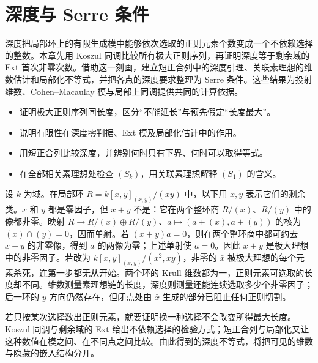 
\chapter{深度与 Serre 条件}
\label{b3:ch:16}

\begin{chapterabstract}
	深度把局部环上的有限生成模中能够依次选取的正则元素个数变成一个不依赖选择的整数。本章先用 Koszul 同调比较所有极大正则序列，再证明深度等于剩余域的 Ext 首次非零次数。借助这一刻画，建立短正合列中的深度引理、关联素理想的维数估计和局部化不等式，并把各点的深度要求整理为 Serre 条件。这些结果为投射维数、Cohen--Macaulay 模与局部上同调提供共同的计算依据。
\end{chapterabstract}

\begin{learninggoals}
	\begin{itemize}
		\item 证明极大正则序列同长度，区分“不能延长”与预先假定“长度最大”。
		\item 说明有限性在深度零判据、Ext 模及局部化估计中的作用。
		\item 用短正合列比较深度，并辨别何时只有下界、何时可以取得等式。
		\item 在全部相关素理想处检查 \((S_k)\)，用关联素理想解释 \((S_1)\) 的含义。
	\end{itemize}
\end{learninggoals}

设 \(k\) 为域。在局部环 \(R=k[x,y]_{(x,y)}/(xy)\) 中，以下用 \(x,y\) 表示它们的剩余类。\(x\) 和 \(y\) 都是零因子，但 \(x+y\) 不是：它在两个整环商 \(R/(x)\)、\(R/(y)\) 中的像都非零。映射 \(R\rightarrow R/(x)\oplus R/(y)\)、\(a\mapsto(a+(x),a+(y))\) 的核为 \((x)\cap(y)=0\)，因而单射。若 \((x+y)a=0\)，则在两个整环商中都可约去 \(x+y\) 的非零像，得到 \(a\) 的两像为零；上述单射使 \(a=0\)。因此 \(x+y\) 是极大理想中的非零因子。若改为 \(k[x,y]_{(x,y)}/(x^2,xy)\)，非零的 \(\bar x\) 被极大理想的每个元素杀死，连第一步都无从开始。两个环的 Krull 维数都为一，正则元素可选取的长度却不同。维数测量素理想链的长度，深度则测量还能连续选取多少个非零因子；后一环的 \(y\) 方向仍然存在，但闭点处由 \(\bar x\) 生成的部分已阻止任何正则切割。

\ProseParagraphBreak

若只按某次选择数出正则元素，就要证明换一种选择不会改变所得最大长度。Koszul 同调与剩余域的 Ext 给出不依赖选择的检验方式；短正合列与局部化又让这种数值在模之间、在不同点之间比较。由此得到的深度不等式，将把可见的维数与隐藏的嵌入结构分开。

